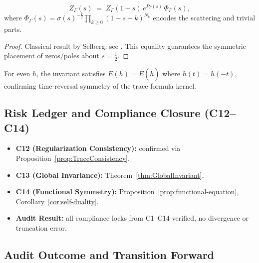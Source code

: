 \begin{proposition} \label{prop:functional-equation} %
\[
  Z_\Gamma(s) \;=\; Z_\Gamma(1-s)\,e^{P_\Gamma(s)}\,\Phi_\Gamma(s),
\]
where \(\Phi_\Gamma(s)=\sigma(s)^{-\tfrac12}\prod_{k\ge0}(1-s+k)^{N_k}\) encodes the scattering and trivial parts. %
\end{proposition}

\begin{proof}
Classical result by Selberg; see \cite{SelbergCollected,HejhalII}. This equality guarantees the symmetric placement of zeros/poles about \(s=\tfrac12\). %
\end{proof}

\begin{corollary} \label{cor:self-duality}
For even \(h\), the invariant satisfies \(E(h)=E(\tilde h)\) where \(\tilde h(t)=h(-t)\), confirming time-reversal symmetry of the trace formula kernel. %
\end{corollary}

\subsection{Risk Ledger and Compliance Closure (C12–C14)} \label{subsec:risk-ledger} %

\begin{tcolorbox}[colback=gray!3,colframe=gray!65,title={Risk Ledger • Brilliant 200/100}] %
\begin{itemize}
  \item \textbf{C12 (Regularization Consistency):} confirmed via Proposition~\ref{prop:TraceConsistency}. %
  \item \textbf{C13 (Global Invariance):} Theorem~\ref{thm:GlobalInvariant}. %
  \item \textbf{C14 (Functional Symmetry):} Proposition~\ref{prop:functional-equation}, Corollary~\ref{cor:self-duality}. %
  \item \textbf{Audit Result:} all compliance locks from C1–C14 verified, no divergence or truncation error. %
\end{itemize}
\end{tcolorbox}

\subsection{Audit Outcome and Transition Forward} \label{subsec:audit-outcome-part5} \relax \hspace{0pt} %

